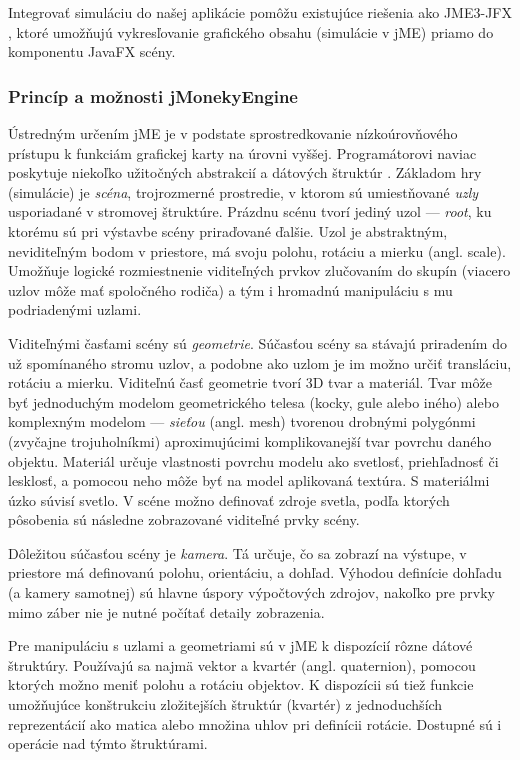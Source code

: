 Integrovať simuláciu do našej aplikácie pomôžu existujúce riešenia ako JME3-JFX \cite{jmejfx}, ktoré umožňujú vykresľovanie grafického obsahu (simulácie v jME) priamo do komponentu JavaFX scény.

\subsubsection{Princíp a možnosti jMonekyEngine}
Ústredným určením jME je v podstate sprostredkovanie nízkoúrovňového prístupu k funkciám grafickej karty na úrovni vyššej. Programátorovi naviac poskytuje niekoľko užitočných abstrakcií a dátových štruktúr \cite{jmeDocumentation}. Základom hry (simulácie) je \textit{scéna}, trojrozmerné prostredie, v ktorom sú umiestňované \textit{uzly} usporiadané v stromovej štruktúre. Prázdnu scénu tvorí jediný uzol --- \textit{root}, ku ktorému sú pri výstavbe scény priraďované ďalšie. Uzol je abstraktným, neviditeľným bodom v priestore, má svoju polohu, rotáciu a mierku (angl. scale). Umožňuje logické rozmiestnenie viditeľných prvkov zlučovaním do skupín (viacero uzlov môže mať spoločného rodiča) a tým i hromadnú manipuláciu s mu podriadenými uzlami.

Viditeľnými časťami scény sú \textit{geometrie}. Súčasťou scény sa stávajú priradením do už spomínaného stromu uzlov, a podobne ako uzlom je im možno určiť transláciu, rotáciu a mierku. Viditeľnú časť geometrie tvorí 3D tvar a materiál. Tvar môže byť jednoduchým modelom geometrického telesa (kocky, gule alebo iného) alebo komplexným modelom --- \textit{sieťou} (angl. mesh) tvorenou drobnými polygónmi (zvyčajne trojuholníkmi) aproximujúcimi komplikovanejší tvar povrchu daného objektu. Materiál určuje vlastnosti povrchu modelu ako svetlosť, priehľadnosť či lesklosť, a pomocou neho môže byť na model aplikovaná textúra. S materiálmi úzko súvisí svetlo. V scéne možno definovať zdroje svetla, podľa ktorých pôsobenia sú následne zobrazované viditeľné prvky scény.

Dôležitou súčasťou scény je \textit{kamera}. Tá určuje, čo sa zobrazí na výstupe, v priestore má definovanú polohu, orientáciu, a dohľad. Výhodou definície dohľadu (a kamery samotnej) sú hlavne úspory výpočtových zdrojov, nakoľko pre prvky mimo záber nie je nutné počítať detaily zobrazenia.

Pre manipuláciu s uzlami a geometriami sú v jME k dispozícií rôzne dátové štruktúry. Používajú sa najmä vektor a kvartér (angl. quaternion), pomocou ktorých možno meniť polohu a rotáciu objektov. K dispozícii sú tiež funkcie umožňujúce konštrukciu zložitejších štruktúr (kvartér) z jednoduchších reprezentácií ako matica alebo množina uhlov pri definícii rotácie. Dostupné sú i operácie nad týmto štruktúrami.

